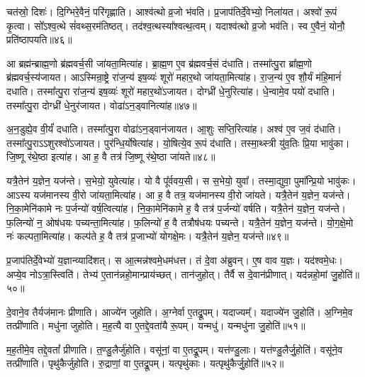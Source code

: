 चत॑स्रो॒ दिशः॑।
दि॒ग्भिरे॒वैनं॒ परि॑गृह्णाति।
आश्व॑त्थो व्र॒जो भ॑वति।
प्र॒जा\-प॑तिर्दे॒वेभ्यो॒ निला॑यत।
अश्वो॑ रू॒पं कृ॒त्वा।
सो᳚ऽश्व॒त्थे सं॑वथ्स॒रम॑तिष्ठत्।
तद॑श्व॒त्थस्या᳚श्वत्थ॒त्वम्।
यदाश्व॑त्थो व्र॒जो भव॑ति।
स्व ए॒वैनं॒ योनौ॒ प्रति॑\-ष्ठापयति॥४६॥\ip\anuvakamend[त्रि॒ष्टुभ॒श्छन्द॒सोऽधि॒ निर्मि॑मीते जुहोति॒ नव॑ च]

आ ब्रह्म॑न्ब्राह्म॒णो ब्र॑ह्म\-वर्च॒सी जा॑यता॒मित्या॑ह।
ब्रा॒ह्म॒ण ए॒व ब्र॑ह्म\-वर्च॒सं द॑धाति।
तस्मा᳚त्पु॒रा ब्रा᳚ह्म॒णो ब्र॑ह्म\-वर्च॒स्य॑जायत।
आऽस्मिन्रा॒ष्ट्रे रा॑ज॒न्य॑ इष॒व्यः॑ शूरो॑ महार॒थो जा॑यता॒मित्या॑ह।
रा॒ज॒न्य॑ ए॒व शौ॒र्यं म॑हि॒मानं॑ दधाति।
तस्मा᳚त्पु॒रा रा॑ज॒न्य॑ इष॒व्यः॑ शूरो॑ महार॒थो॑\-ऽजायत।
दोग्ध्री॑ धे॒नुरित्या॑ह।
धे॒न्वामे॒व पयो॑ दधाति।
तस्मा᳚त्पु॒रा दोग्ध्री॑ धे॒नुर॑जायत।
वोढा॑\-ऽन॒ड्वानित्या॑ह॥४७॥\ip

अ॒न॒डुह्ये॒व वी॒र्यं॑ दधाति।
तस्मा᳚त्पु॒रा वोढा॑\-ऽन॒ड्वान॑जायत।
आ॒शुः सप्ति॒रित्या॑ह।
अश्व॑ ए॒व ज॒वं द॑धाति।
तस्मा᳚त्पु॒रा\-ऽऽशुरश्वो॑\-ऽजायत।
पुर॑न्धि॒र्योषेत्या॑ह।
यो॒षित्ये॒व रू॒पं द॑धाति।
तस्मा॒थ्स्त्री यु॑व॒तिः प्रि॒या भावु॑का।
जि॒ष्णू र॑थे॒ष्ठा इत्या॑ह।
आ ह॒ वै तत्र॑ जि॒ष्णू र॑थे॒ष्ठा जा॑यते॥४८॥\ip

यत्रै॒तेन॑ य॒ज्ञेन॒ यज॑न्ते।
स॒भेयो॒ युवेत्या॑ह।
यो वै पू᳚र्ववय॒सी।
स स॒भेयो॒ युवा᳚।
तस्मा॒द्युवा॒ पुमा᳚न्प्रि॒यो भावु॑कः।
आऽस्य यज॑मानस्य वी॒रो जा॑यता॒मित्या॑ह।
आ ह॒ वै तत्र॒ यज॑मानस्य वी॒रो जा॑यते।
यत्रै॒तेन॑ य॒ज्ञेन॒ यज॑न्ते।
नि॒का॒मेनि॑कामे नः प॒र्जन्यो॑ वर्\mbox{}ष॒त्वित्या॑ह।
नि॒का॒मेनि॑कामे ह॒ वै तत्र॑ प॒र्जन्यो॑ वर्\mbox{}षति।
यत्रै॒तेन॑ य॒ज्ञेन॒ यज॑न्ते।
फ॒लिन्यो॑ न॒ ओष॑धयः पच्यन्ता॒मित्या॑ह।
फ॒लिन्यो॑ ह॒ वै तत्रौष॑धयः पच्यन्ते।
यत्रै॒तेन॑ य॒ज्ञेन॒ यज॑न्ते।
यो॒ग॒क्षे॒मो नः॑ कल्पता॒मित्या॑ह।
कल्प॑ते ह॒ वै तत्र॑ प्र॒जाभ्यो॑ योगक्षे॒मः।
यत्रै॒तेन॑ य॒ज्ञेन॒ यज॑न्ते॥४९॥\ip\anuvakamend[अ॒न॒ड्वानित्या॑ह जायते वर्‌\mbox{}षति स॒प्त च॑]

प्र॒जा\-प॑तिर्दे॒वेभ्यो॑ य॒ज्ञान्व्यादि॑शत्।
स आ॒त्मन्न॑श्वमे॒धम॑धत्त।
तं दे॒वा अ॑ब्रुवन्।
ए॒ष वाव य॒ज्ञः।
यद॑श्वमे॒धः।
अप्ये॒व नोऽत्रा॒स्त्विति॑।
तेभ्य॑ ए॒तान॑न्नहो॒मान्प्राय॑च्छत्।
तान॑जुहोत्।
तैर्वै स दे॒वान॑प्रीणात्।
यद॑न्नहो॒मां जु॒होति॑॥५०॥\ip

दे॒वाने॒व तैर्यज॑मानः प्रीणाति।
आज्ये॑न जुहोति।
अ॒ग्नेर्वा ए॒तद्रू॒पम्।
यदाज्यम्᳚।
यदाज्ये॑न जु॒होति॑।
अ॒ग्निमे॒व तत्प्री॑णाति।
मधु॑ना जुहोति।
म॒ह॒त्यै वा ए॒तद्दे॒वता॑यै रू॒पम्।
यन्मधु॑।
यन्मधु॑ना जु॒होति॑॥५१॥\ip

म॒ह॒तीमे॒व तद्दे॒वतां᳚ प्रीणाति।
त॒ण्डु॒लैर्जु॑होति।
वसू॑नां॒ वा ए॒तद्रू॒पम्।
यत्त॑ण्डु॒लाः।
यत्त॑ण्डु॒लैर्जु॒होति॑।
वसू॑ने॒व तत्प्री॑णाति।
पृथु॑कैर्जुहोति।
रु॒द्राणां॒ वा ए॒तद्रू॒पम्।
यत्पृथु॑काः।
यत्पृथु॑कैर्जु॒होति॑॥५२॥\ip

